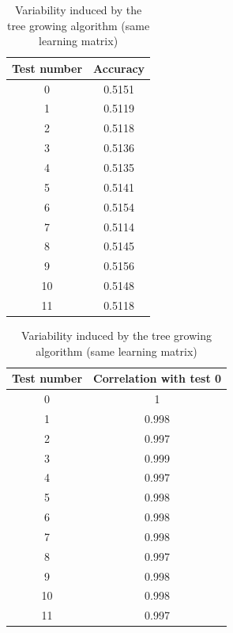 \documentclass[a4paper]{report}
\begin{document}
		
		\begin{table}
			\centering
			\begin{subtable}{0.5\textwidth}
				\begin{tabular}{c|c}
				\hline
				Test number & Accuracy \\
				\hline \hline
				0 & 0.5151 \\
				1 & 0.5119 \\
				2 & 0.5118 \\
				3 & 0.5136 \\
				4 & 0.5135 \\
				5 & 0.5141 \\
				6 & 0.5154 \\
				7 & 0.5114 \\
				8 & 0.5145 \\
				9 & 0.5156 \\
				10 & 0.5148 \\
				11 & 0.5118 \\
				\hline
				\end{tabular}
				\caption{\label{tab:AccVarTrees}Accuracy variability}
			\end{subtable}%
			\begin{subtable}{0.5\textwidth}
				\begin{tabular}{c|c}
				\hline
				Test number & Correlation with test 0\\
				\hline \hline
				0 & 1\\
				1 & 0.998 \\
				2 & 0.997 \\
				3 & 0.999 \\
				4 & 0.997 \\
				5 & 0.998 \\
				6 & 0.998 \\
				7 & 0.998 \\
				8 & 0.997 \\
				9 & 0.998 \\
				10 & 0.998 \\
				11 & 0.997 \\
				\hline
				\end{tabular}
				\caption{\label{tab:CorrMatFiltTreeVar}Correlation vector of the filter importances with test number 0}
			\end{subtable}
			\caption{\label{tab:TreeVar}Variability induced by the tree growing algorithm (same learning matrix)}
		\end{table}
		
\end{document}

